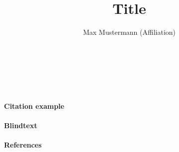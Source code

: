 \documentclass[
12pt,
a4paper,
]{article}
\author{Max Mustermann (Affiliation)}
\title{Title}
\makeatletter
\renewcommand\maketitle{

  ~\vspace{-1.1cm}

  {\raggedright
    \renewcommand{\baselinestretch}{1.2}\selectfont
  {\bfseries\large\@title}\\[2ex]
  {\large\@author}

  }
}
\makeatother
\begin{document}
\maketitle

\paragraph{Citation example}



\paragraph{Blindtext} \lipsum

\paragraph{References}
{\tiny
\printbibliography[heading=none]
}
\end{document}
